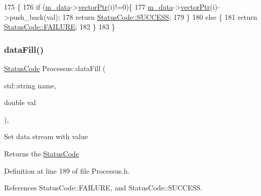 \begin{DoxyCode}
175                                         \{
176     \textcolor{keywordflow}{if} (\hyperlink{classProcessus_a3da9a9de8af54e2f47807a3e09dfccff}{m\_data}->\hyperlink{classData_aa2153cb57f6f1a67b54eafe5582e0b6b}{vectorPtr}(i)!=0)\{
177       \hyperlink{classProcessus_a3da9a9de8af54e2f47807a3e09dfccff}{m\_data}->\hyperlink{classData_aa2153cb57f6f1a67b54eafe5582e0b6b}{vectorPtr}(i)->push\_back(val);
178       \textcolor{keywordflow}{return} \hyperlink{classStatusCode_a6f565cbeadc76d14c72f047e5e85eb4badd0da38d3ba0d922efd1f4619bc37ad8}{StatusCode::SUCCESS};
179     \}
180     \textcolor{keywordflow}{else} \{
181       \textcolor{keywordflow}{return} \hyperlink{classStatusCode_a6f565cbeadc76d14c72f047e5e85eb4ba3da73d4c469762eb9d3c960368252b26}{StatusCode::FAILURE};
182     \}
183   \}
\end{DoxyCode}
\mbox{\label{classProcessus_aa31ab71711f7af6a729441ff573f69c9}} 
\subsubsection{\texorpdfstring{data\+Fill()}{dataFill()}\hspace{0.1cm}{\footnotesize\ttfamily [2/2]}}
{\footnotesize\ttfamily \hyperlink{classStatusCode}{Status\+Code} Processus\+::data\+Fill (\begin{DoxyParamCaption}\item[{std\+::string}]{name,  }\item[{double}]{val }\end{DoxyParamCaption})\hspace{0.3cm}{\ttfamily [inline]}, {\ttfamily [inherited]}}

Set data stream with value \begin{DoxyReturn}{Returns}
the \hyperlink{classStatusCode}{Status\+Code} 
\end{DoxyReturn}


Definition at line 189 of file Processus.\+h.



References Status\+Code\+::\+F\+A\+I\+L\+U\+RE, and Status\+Code\+::\+S\+U\+C\+C\+E\+SS.


